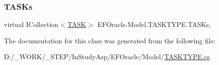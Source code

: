 \mbox{\label{class_e_f_oracle_1_1_model_1_1_t_a_s_k_t_y_p_e_ae608b740cf60d199acb2940b9c5e859d}} 
\subsubsection{\texorpdfstring{T\+A\+S\+Ks}{TASKs}}
{\footnotesize\ttfamily virtual I\+Collection$<$\hyperlink{class_e_f_oracle_1_1_model_1_1_t_a_s_k}{T\+A\+SK}$>$ E\+F\+Oracle.\+Model.\+T\+A\+S\+K\+T\+Y\+P\+E.\+T\+A\+S\+Ks\hspace{0.3cm}{\ttfamily [get]}, {\ttfamily [set]}}



The documentation for this class was generated from the following file\+:\begin{DoxyCompactItemize}
\item 
D\+:/\+\_\+\+W\+O\+R\+K/\+\_\+\+S\+T\+E\+P/\+In\+Study\+Asp/\+E\+F\+Oracle/\+Model/\hyperlink{_t_a_s_k_t_y_p_e_8cs}{T\+A\+S\+K\+T\+Y\+P\+E.\+cs}\end{DoxyCompactItemize}
